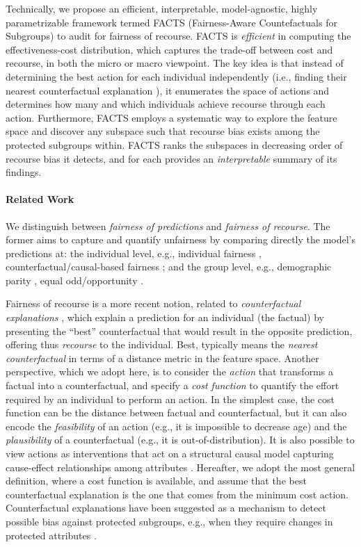 \documentclass{article}
\begin{document}
Technically, we propose an efficient, interpretable, model-agnostic, highly parametrizable framework termed FACTS (Fairness-Aware Countefactuals for Subgroups) to audit for fairness of recourse. FACTS is \emph{efficient} in computing the effectiveness-cost distribution, which captures the trade-off between cost and recourse, in both the micro or macro viewpoint. The key idea is that instead of determining the best action for each individual independently (i.e., finding their nearest counterfactual explanation \cite{wachter2017counterfactual}), it enumerates the space of actions and determines how many and which individuals achieve recourse through each action. Furthermore, FACTS employs a systematic way to explore the feature space and discover any subspace such that recourse bias exists among the protected subgroups within. FACTS ranks the subspaces in decreasing order of recourse bias it detects, and for each provides an \emph{interpretable} summary of its findings. 


\paragraph{Related Work}

We distinguish between \emph{fairness of predictions} and \emph{fairness of recourse}. The former aims to capture and quantify unfairness by comparing directly the model's predictions \cite{10.1145/3457607, binns2018fairness} at: the individual level, e.g., individual fairness \cite{dwork2012fairness}, counterfactual/causal-based fairness \cite{kusner2017counterfactual,kilbertus2017avoiding,loftus2018causal}; and the group level, e.g., demographic parity \cite{zafar2017fairness}, equal odd/opportunity \cite{hardt2016equality}.

Fairness of recourse is a more recent notion, related to \emph{counterfactual explanations} \cite{wachter2017counterfactual}, which explain a prediction for an individual (the factual) by presenting the ``best'' counterfactual that would result in the opposite prediction, offering thus \emph{recourse} to the individual. Best, typically means the \emph{nearest counterfactual} in terms of a distance metric in the feature space. Another perspective, which we adopt here, is to consider the \emph{action} that transforms a factual into a counterfactual, and specify a \emph{cost function} to quantify the effort required by an individual to perform an action. In the simplest case, the cost function can be the distance between factual and counterfactual, but it can also encode the \emph{feasibility} of an action (e.g., it is impossible to decrease age) and the \emph{plausibility} of a counterfactual (e.g., it is out-of-distribution). It is also possible to view actions as interventions that act on a structural causal model capturing cause-effect relationships among attributes \cite{KarimiSV21}. Hereafter, we adopt the most general definition, where a cost function is available, and assume that the best counterfactual explanation is the one that comes from the minimum cost action.
Counterfactual explanations have been suggested as a mechanism to detect possible bias against protected subgroups, e.g., when they require changes in protected attributes \cite{2020_AISTATS_KBBV}. 
\end{document}
